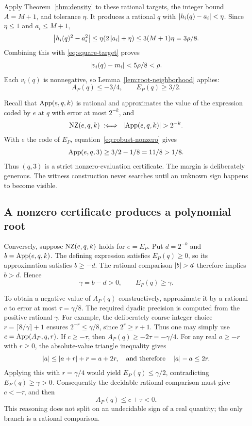 Apply Theorem~\ref{thm:density} to these rational targets, the integer bound
$A=M+1$, and tolerance $\eta$. It produces a rational $q$ with
$\left|h_i(q)-a_i\right|<\eta$. Since $\eta\le1$ and $a_i\le M+1$,
\[
 \left|h_i(q)^2-a_i^2\right|
 \le\eta(2\left|a_i\right|+\eta)
 \le3(M+1)\eta=3\rho/8.
\]
Combining this with \eqref{eq:square-target} proves
\[
 \left|v_i(q)-m_i\right|<5\rho/8<\rho.
\]
Each $v_i(q)$ is nonnegative, so Lemma~\ref{lem:root-neighborhood} applies:
\begin{equation}
 A_P(q)\le-3/4,
 \qquad
 E_P(q)\ge3/2.\label{eq:robust-nonzero}
\end{equation}

Recall that $\operatorname{App}(e,q,k)$ is rational and approximates the value of the
expression coded by $e$ at $q$ with error at most $2^{-k}$, and
\[
 \NZ(e,q,k)\;:\!\!\iff\;
 \abs{\App(e,q,k)}>2^{-k}.
\]
With $e$ the code of $E_P$, equation~\eqref{eq:robust-nonzero} gives
\[
 \operatorname{App}(e,q,3)\ge3/2-1/8=11/8>1/8.
\]
Thus $(q,3)$ is a strict nonzero-evaluation certificate. The margin is
deliberately generous. The witness construction never searches until an
unknown sign happens to become visible.

\subsection{A nonzero certificate produces a polynomial root}

Conversely, suppose $\operatorname{NZ}(e,q,k)$ holds for $e=E_P$. Put $d=2^{-k}$ and
$b=\operatorname{App}(e,q,k)$. The defining expression satisfies $E_P(q)\ge0$, so its
approximation satisfies $b\ge-d$. The rational comparison
$\abs b>d$ therefore implies $b>d$. Hence
\[
 \gamma=b-d>0,
 \qquad E_P(q)\ge\gamma.
\]

To obtain a negative value of $A_P(q)$ constructively, approximate it by a
rational $c$ to error at most $\tau=\gamma/8$. The required dyadic
precision is computed from the positive rational $\gamma$. For example,
the deliberately coarse integer choice
$r=\lceil8/\gamma\rceil+1$ ensures $2^{-r}\le\gamma/8$, since
$2^r\ge r+1$. Thus one may simply use $c=\operatorname{App}(A_P,q,r)$. If
$c\ge-\tau$, then $A_P(q)\ge-2\tau=-\gamma/4$. For any real $a\ge-r$
with $r\ge0$, the absolute-value triangle inequality gives
\[
 \left|a\right|\le\left|a+r\right|+r=a+2r,
 \quad\hbox{and therefore}\quad \left|a\right|-a\le2r.
\]
Applying this with $r=\gamma/4$ would yield
$E_P(q)\le\gamma/2$, contradicting $E_P(q)\ge\gamma>0$.
Consequently the decidable rational comparison must give $c<-\tau$, and
then
\[
 A_P(q)\le c+\tau<0.
\]
This reasoning does not split on an undecidable sign of a real quantity; the
only branch is a rational comparison.

